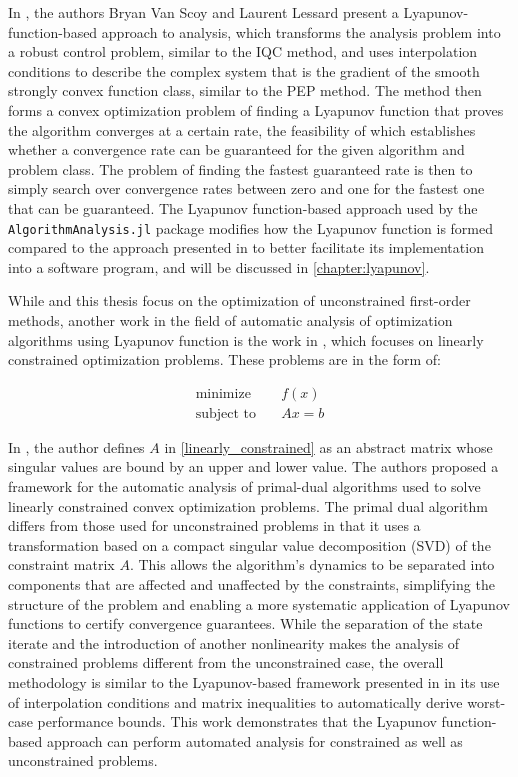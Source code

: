 In \cite{tutorial}, the authors Bryan Van Scoy and Laurent Lessard present a Lyapunov-function-based approach to analysis, which transforms the analysis problem into a robust control problem, similar to the IQC method, and uses interpolation conditions to describe the complex system that is the gradient of the smooth strongly convex function class, similar to the PEP method. The method then forms a convex optimization problem of finding a Lyapunov function that proves the algorithm converges at a certain rate, the feasibility of which establishes whether a convergence rate can be guaranteed for the given algorithm and problem class. The problem of finding the fastest guaranteed rate is then to simply search over convergence rates between zero and one for the fastest one that can be guaranteed. The Lyapunov function-based approach used by the \texttt{AlgorithmAnalysis.jl} package modifies how the Lyapunov function is formed compared to the approach presented in \cite{tutorial} to better facilitate its implementation into a software program, and will be discussed in \cref{chapter:lyapunov}.

While \cite{tutorial} and this thesis focus on the optimization of unconstrained first-order methods, another work in the field of automatic analysis of optimization algorithms using Lyapunov function is the work in \cite{primaldual}, which focuses on linearly constrained optimization problems. These problems are in the form of:

\begin{subequations}\label{linearly_constrained}
    \begin{align}
      \textrm{minimize} &\quad f(x) \\
      \textrm{subject to} &\quad Ax = b 
    \end{align}
  \end{subequations} 

In \cite{primaldual}, the author defines $A$ in \eqref{linearly_constrained} as an abstract matrix whose singular values are bound by an upper and lower value. The authors proposed a framework for the automatic analysis of primal-dual algorithms \cite{primaldualalgo} used to solve linearly constrained convex optimization problems. The primal dual algorithm differs from those used for unconstrained problems in that it uses a transformation based on a compact singular value decomposition (SVD) of the constraint matrix $A$. This allows the algorithm's dynamics to be separated into components that are affected and unaffected by the constraints, simplifying the structure of the problem and enabling a more systematic application of Lyapunov functions to certify convergence guarantees. While the separation of the state iterate and the introduction of another nonlinearity makes the analysis of constrained problems different from the unconstrained case, the overall methodology is similar to the Lyapunov-based framework presented in \cite{tutorial} in its use of interpolation conditions and matrix inequalities to automatically derive worst-case performance bounds. This work demonstrates that the Lyapunov function-based approach can perform automated analysis for constrained as well as unconstrained problems.

